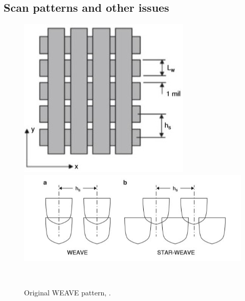 \documentclass[a4paper, twoside, 11pt]{report}
\begin{document}
\subsection{Scan patterns and other issues}
%
\begin{figure}[b!]
  \centering
  \begin{minipage}[b]{0.45\textwidth}
    \includegraphics[width=\textwidth]{weave1}
  \end{minipage}
  \hfill
  \begin{minipage}[b]{0.45\textwidth}
    \includegraphics[width=\textwidth]{weave2}
  \end{minipage}
  \\[1pt]
  \begin{minipage}[t]{0.45\textwidth}
    \caption{Original WEAVE pattern, \cite[p. 87]{AMT}.}
  \end{minipage}
  \hfill
  \begin{minipage}[t]{0.45\textwidth}

\end{minipage}
\end{figure}
\end{document}
